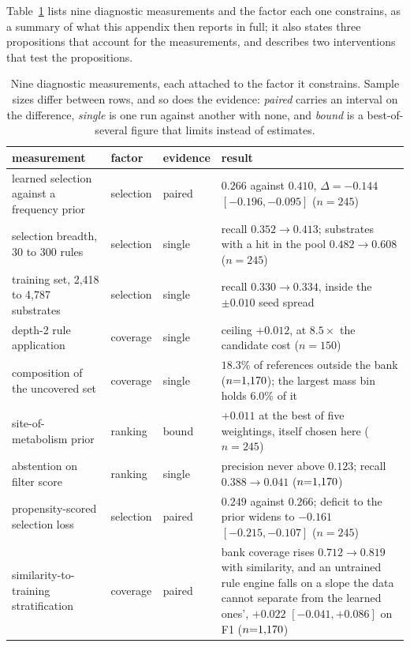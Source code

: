 Table~\ref{tab:levers} lists nine diagnostic measurements and the factor each one constrains, as a
summary of what this appendix then reports in full; it also states three propositions that account
for the measurements, and describes two interventions that test the propositions.

\begin{table}[!htbp]
\caption{Nine diagnostic measurements, each attached to the factor it constrains. Sample sizes differ
between rows, and so does the evidence: \emph{paired} carries an interval on the difference,
\emph{single} is one run against another with none, and \emph{bound} is a best-of-several figure
that limits instead of estimates.}
\label{tab:levers}
\begin{center}
\footnotesize
\begin{tabular}{p{3.9cm}p{1.2cm}p{0.9cm}p{6.0cm}}
\toprule
\textbf{measurement} & \textbf{factor} & \textbf{evidence} & \textbf{result} \\
\midrule
learned selection against a frequency prior & selection & paired &
$0.266$ against $0.410$, $\Delta = -0.144$ $[-0.196,-0.095]$ ($n{=}245$) \\
selection breadth, 30 to 300 rules & selection & single &
recall $0.352 \to 0.413$; substrates with a hit in the pool $0.482 \to 0.608$ ($n{=}245$) \\
training set, 2{,}418 to 4{,}787 substrates & selection & single &
recall $0.330 \to 0.334$, inside the $\pm0.010$ seed spread \\
depth-2 rule application & coverage & single &
ceiling $+0.012$, at $8.5\times$ the candidate cost ($n{=}150$) \\
composition of the uncovered set & coverage & single &
$18.3\%$ of references outside the bank ($n{=}1{,}170$); the largest mass bin holds $6.0\%$ of it \\
site-of-metabolism prior & ranking & bound &
$+0.011$ at the best of five weightings, itself chosen here ($n{=}245$) \\
abstention on filter score & ranking & single &
precision never above $0.123$; recall $0.388 \to 0.041$ ($n{=}1{,}170$) \\
propensity-scored selection loss & selection & paired &
$0.249$ against $0.266$; deficit to the prior widens to $-0.161$ $[-0.215,-0.107]$ ($n{=}245$) \\
similarity-to-training stratification & coverage & paired &
bank coverage rises $0.712 \to 0.819$ with similarity, and an untrained rule engine falls on a slope
the data cannot separate from the learned ones', $+0.022$ $[-0.041,+0.086]$ on F1 ($n{=}1{,}170$) \\
\bottomrule
\end{tabular}
\end{center}
\end{table}


